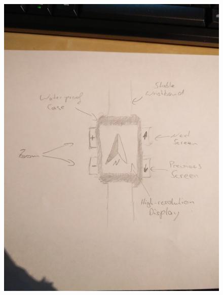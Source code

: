 \documentclass[a4paper,10pt]{article}
\begin{document}
\begin{figure}[ht]
\centering \includegraphics[width=1.0\textwidth]{images/uhr2.jpg}
\label{fig:wwu_logo}
\end{figure}
\end{document}
